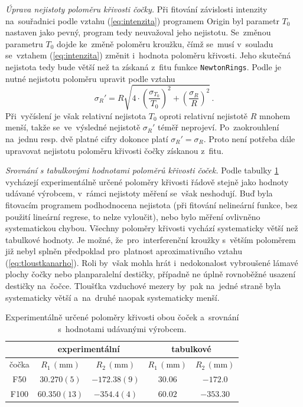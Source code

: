 \documentclass{../concepts/titul_protokol_p/prepareprotokol} %
\newcommand{\relative}[1]{
\frac{\sigma_{#1}}{#1}
}
\newcommand{\squared}[1]{
\left( #1 \right)^2
}
\newcommand{\relsqr}[1]{
\squared{\relative{#1}}
}
\begin{document}
\textit{Úprava nejistoty poloměru křivosti čočky.}
Při fitování závislosti intenzity na~souřadnici podle vztahu (\ref{eq:intenzita}) programem Origin byl
parametr $T_0$ nastaven jako pevný, program tedy neuvažoval jeho nejistotu. Se~změnou parametru $T_0$
dojde ke~změně poloměru kroužku, čímž se~musí v~souladu se~vztahem (\ref{eq:intenzita}) změnit
i~hodnota poloměru křivosti. Jeho skutečná nejistota tedy bude větší než ta získaná z~fitu 
funkce \texttt{NewtonRings}. Podle \cite{englich} je nutné nejistotu poloměru upravit podle vztahu
\begin{equation}
    \label{sigmaR}
    \sigma_R' = R \sqrt{ 4\cdot \relsqr{T_0} + \relsqr{R}} \,.
\end{equation}
Při~vyčíslení je však relativní nejistota $T_0$ oproti relativní nejistotě $R$ mnohem menší, 
takže se~ve~výsledné nejistotě
$\sigma_R'$ téměř neprojeví. Po~zaokrouhlení na~jednu resp. dvě platné cifry dokonce platí $\sigma_R' = \sigma_R$.
Proto není potřeba dále upravovat nejistotu poloměru křivosti čočky získanou z~fitu.

\textit{Srovnání s tabulkovými hodnotami poloměrů křivosti čoček.}
Podle tabulky \ref{tab:polomerydiskuze} vycházejí experimentálně určené poloměry křivosti řádově stejně
jako hodnoty udávané výrobcem, v~rámci nejistoty měření se~však neshodují. Buď byla fitovacím programem
podhodnocena nejistota (při fitování nelineární funkce, bez použití lineární regrese, to nelze vyloučit),
nebo bylo měření ovlivněno systematickou chybou. Všechny poloměry křivosti vychází systematicky
větší než tabulkové hodnoty. Je možné, že~pro~interferenční kroužky
s~větším poloměrem již nebyl splněn předpoklad pro~platnost aproximativního vztahu (\ref{eq:tloustkanarho}).
Roli by~však mohla hrát i~nedokonalost vybroušené lámavé plochy čočky nebo planparalelní destičky, 
případně ne úplně rovnoběžné usazení destičky na~čočce. Tloušťka vzduchové mezery by~pak na~jedné
straně byla systematicky větší a~na~druhé naopak systematicky menší.

\begin{table}[!htbp]
    \centering
    \caption{Experimentálně určené poloměry křivosti obou čoček a~srovnání s~hodnotami udávanými výrobcem.}
    \begin{tabular}{c|cc|cc}
        \toprule
         & \multicolumn{2}{c|}{experimentální} & \multicolumn{2}{c}{tabulkové} \\
        \midrule
        čočka & $R_{1} \, (\mathrm{mm})$ & $R_{2} \, (\mathrm{mm})$ & 
        $R_{1} \, (\mathrm{mm})$ & $R_{2} \, (\mathrm{mm})$ \\
        \midrule
        F50 & $30.270(5)$ & $-172.38(9)$ & $30.06$ & $-172.0$ \\
        F100 & $60.350(13)$ & $-354.4(4)$ & $60.02$ & $-353.30$ \\
        \bottomrule
    \end{tabular}
    \label{tab:polomerydiskuze}
\end{table}
\end{document}
